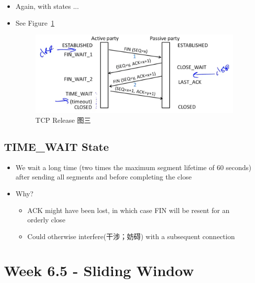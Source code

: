 \documentclass[12pt]{ctexart}   %
\begin{document}
\begin{itemize}
		 \item Again, with states ...
		 \item See Figure~\ref{fig:6-4-6}
		  
		 \begin{figure}[h!] %
		\centering
		 \includegraphics[scale=0.7]{images/6-4-6}
		\caption{  TCP Release 图三 }
		 \label{fig:6-4-6}
		 \end{figure}

	\end{itemize}
	
	\subsection{TIME\_WAIT State}
	\begin{itemize}
		\item We wait a long time (two times the maximum segment lifetime of 60 seconds) after sending all segments and before completing the close
		\item Why?
		\begin{itemize}
			\item ACK might have been lost, in which case FIN will be resent for an orderly close
			\item Could otherwise interfere(干涉；妨碍) with a subsequent connection
		\end{itemize}
	\end{itemize}
	

\section{Week 6.5 - Sliding Window}
\end{document}
